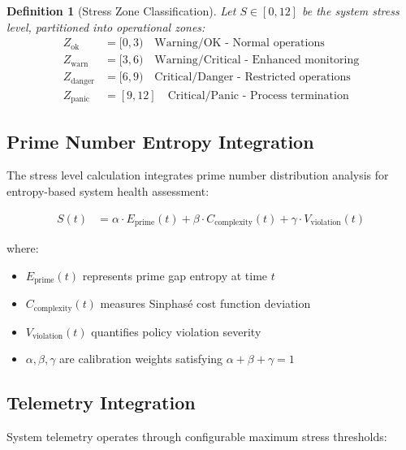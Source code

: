 \documentclass[a4paper,12pt]{article}
\newtheorem{definition}{Definition}
\begin{document}
\begin{definition}[Stress Zone Classification]
Let $S \in [0,12]$ be the system stress level, partitioned into operational zones:
\begin{align}
Z_{\text{ok}} &= [0,3) \quad \text{Warning/OK - Normal operations} \\
Z_{\text{warn}} &= [3,6) \quad \text{Warning/Critical - Enhanced monitoring} \\
Z_{\text{danger}} &= [6,9) \quad \text{Critical/Danger - Restricted operations} \\
Z_{\text{panic}} &= [9,12] \quad \text{Critical/Panic - Process termination}
\end{align}
\end{definition}

\subsection{Prime Number Entropy Integration}

The stress level calculation integrates prime number distribution analysis for entropy-based system health assessment:

\begin{align}
S(t) &= \alpha \cdot E_{\text{prime}}(t) + \beta \cdot C_{\text{complexity}}(t) + \gamma \cdot V_{\text{violation}}(t)
\end{align}

where:
\begin{itemize}
\item $E_{\text{prime}}(t)$ represents prime gap entropy at time $t$
\item $C_{\text{complexity}}(t)$ measures Sinphasé cost function deviation
\item $V_{\text{violation}}(t)$ quantifies policy violation severity
\item $\alpha, \beta, \gamma$ are calibration weights satisfying $\alpha + \beta + \gamma = 1$
\end{itemize}

\subsection{Telemetry Integration}

System telemetry operates through configurable maximum stress thresholds:
\end{document}
